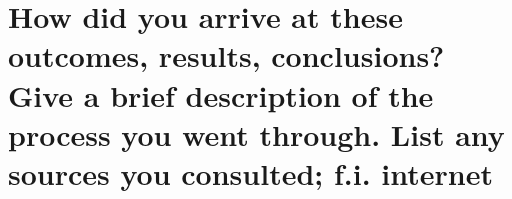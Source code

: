 \section{How did you arrive at these outcomes, results, conclusions? Give a brief description of the process you went through. List any sources you consulted; f.i. internet}

